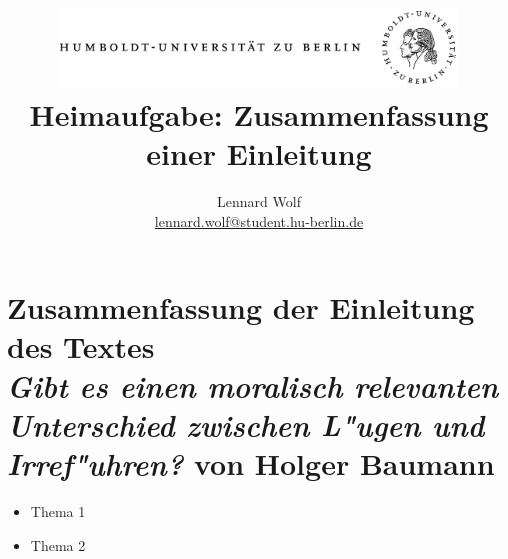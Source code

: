 \documentclass[a4paper]{article}
\begin{document}
\title{
	\includegraphics*[width=0.79\textwidth]{images/hu_logo.png}\\
	\vspace{24pt}
	Heimaufgabe: Zusammenfassung einer Einleitung}
\author{Lennard Wolf\\
        \href{mailto:lennard.wolf@student.hu-berlin.de}{lennard.wolf@student.hu-berlin.de}}
\maketitle
\newpage


\section*{Zusammenfassung der Einleitung des Textes \\ \emph{Gibt es einen moralisch relevanten Unterschied zwischen L"ugen und Irref"uhren?} von Holger Baumann}




\begin{itemize}
    \item Thema 1
    \item Thema 2
  \end{itemize}
\newpage

\end{document}
